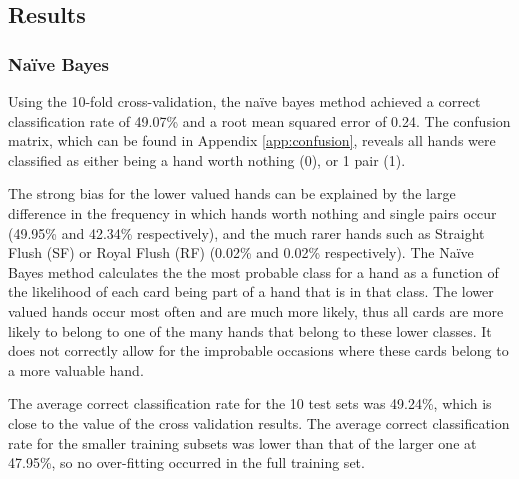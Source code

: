 \documentclass[10pt, a4paper]{article}
\begin{document}
\subsection*{Results}

\subsubsection*{Na\"ive Bayes}

Using the 10-fold cross-validation, the na\"ive bayes method achieved a correct classification rate of 49.07\% and a root mean squared error of 0.24. The confusion matrix, which can be found in  Appendix \ref{app:confusion}, reveals all hands were classified as either being a hand worth nothing (0), or 1 pair (1). 

The strong bias for the lower valued hands can be explained by the large difference in the frequency in which hands worth nothing and single pairs occur (49.95\% and 42.34\% respectively), and the much rarer hands such as Straight Flush (SF) or Royal Flush (RF) (0.02\% and 0.02\% respectively). The Na\"ive Bayes method calculates the the most probable class for a hand as a function of the likelihood of each card being part of a hand that is in that class. The lower valued hands occur most often and are much more likely, thus all cards are more likely to belong to one of the many hands that belong to these lower classes. It does not correctly allow for the improbable occasions where these cards belong to a more valuable hand.

The average correct classification rate for the 10 test sets was 49.24\%, which is close to the value of the cross validation results. The average correct classification rate for the smaller training subsets was lower than that of the larger one at 47.95\%, so no over-fitting occurred in the full training set. 
\end{document}
